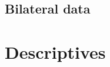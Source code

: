 \documentclass[11pt,a4paper]{scrartcl}
\begin{document}
\subsection{Bilateral data}


\clearpage
\FloatBarrier
\section{Descriptives}


 

% 
% 

 

 

\clearpage
\FloatBarrier
\end{document}
